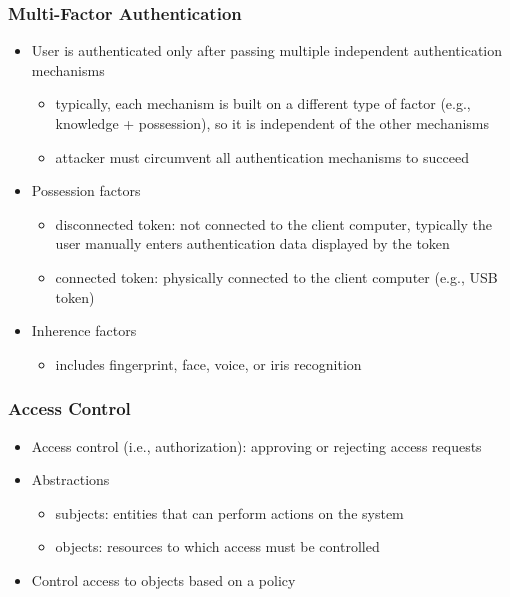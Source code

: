 \documentclass[final]{article}
\begin{document}
\subsubsection*{Multi-Factor Authentication}
\begin{itemize}[nosep]
    \item User is authenticated only after passing multiple independent authentication mechanisms
          \begin{itemize}[nosep]
              \item typically, each mechanism is built on a different type of factor (e.g., knowledge + possession), so it is independent of the other mechanisms
              \item attacker must circumvent all authentication mechanisms to succeed
          \end{itemize}
    \item Possession factors
          \begin{itemize}[nosep]
              \item disconnected token: not connected to the client computer, typically the user manually enters authentication data displayed by the token
              \item connected token: physically connected to the client computer (e.g., USB token)
          \end{itemize}
    \item Inherence factors
          \begin{itemize}
              \item includes fingerprint, face, voice, or iris recognition
          \end{itemize}
\end{itemize}
\subsubsection*{Access Control}
\begin{itemize}[nosep]
    \item Access control (i.e., authorization): approving or rejecting access requests
    \item Abstractions
          \begin{itemize}[nosep]
              \item subjects: entities that can perform actions on the system
              \item objects: resources to which access must be controlled
          \end{itemize}
    \item Control access to objects based on a policy
\end{itemize}
\end{document}
